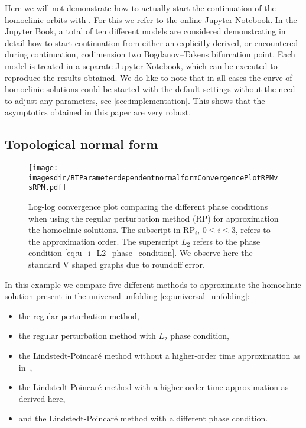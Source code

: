 Here we will not demonstrate how to actually start the continuation of the
homoclinic orbits with \MATCONT. For this we refer to the 
\href{https://mmbosschaert.github.io/MatCont7p2NewInitBTHom-/}{online Jupyter Notebook}.
In the Jupyter Book, a total of ten different models are considered
demonstrating in detail how to start continuation from either an explicitly
derived, or encountered during continuation, codimension two Bogdanov--Takens
bifurcation point. Each model is treated in a separate Jupyter Notebook, which
can be executed to reproduce the results obtained. We do like to note that in
all cases the curve of homoclinic solutions could be started with the default
settings without the need to adjust any parameters, see
\cref{sec:implementation}. This shows that the asymptotics obtained in this
paper are very robust.

\subsection{Topological normal form}
\label{sec:topological_normal_form}

\begin{figure}
    \texttt{[image: \\imagesdir/BTParameterdependentnormalformConvergencePlotRPMvsRPM.pdf]}
    \caption{Log-log convergence plot comparing the different phase conditions
        when using the regular perturbation method (RP) for approximation the
        homoclinic solutions. The subscript in RP$_i$, $0\leq i \leq 3$, refers
        to the approximation order. The superscript $L_2$ refers to the phase
        condition \cref{eq:u_i_L2_phase_condition}. We observe here the standard V
        shaped graphs due to roundoff error.} 
    \label{fig:RP_vs_RPL2}
\end{figure}

In this example we compare five different methods to approximate the homoclinic
solution present in the universal unfolding \cref{eq:universal_unfolding}: 
\begin{itemize}
    \item the regular perturbation method, 
    \item the regular perturbation method with $L_2$ phase condition,
    \item the Lindstedt-Poincar\'e method without a higher-order time
        approximation as in~\cite{Al-Hdaibat2016},
    \item the Lindstedt-Poincar\'e method with a higher-order time
        approximation as derived here, 
    \item and the Lindstedt-Poincar\'e method with a different phase condition.
\end{itemize} 

